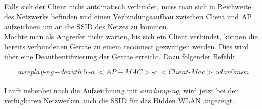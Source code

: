 Falls sich der Client nicht automatisch verbindet, muss man sich in Reichweite des Netzwerks befinden und einen Verbindungsaufbau zwischen Client und AP aufzeichnen um an die SSID des Netzes zu kommen. \\
Möchte man als Angreifer nicht warten, bis sich ein Client verbindet, können die bereits verbundenen Geräte zu einem reconnect gezwungen werden. Dies wird über eine Deauthentifizierung der Geräte erreicht.
Dazu folgender Befehl:


$$aireplay\text{-}ng~\text{-}\text{-}deauth~5~\text{-}a~<AP-MAC> \text{-}c~<Client\text{-}Mac>~wlan0mon$$\\

Läuft nebenbei noch die Aufzeichnung mit \textit{airodump-ng}, wird jetzt bei den verfügbaren Netzwerken auch die SSID für das Hidden WLAN angezeigt.

